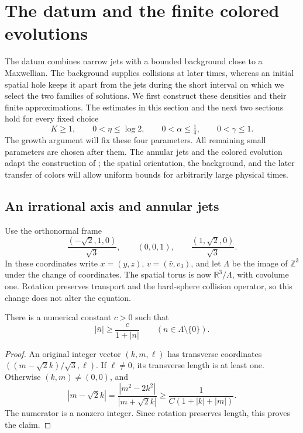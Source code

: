 \section{The datum and the finite colored evolutions}
\label{sec:construction}

The datum combines narrow jets with a bounded background close to a
Maxwellian.  The background supplies collisions at later times, whereas
an initial spatial hole keeps it apart from the jets during the short
interval on which we select the two families of solutions.  We first
construct these densities and their finite approximations.  The estimates
in this section and the next two sections hold for every fixed choice
\begin{equation}
 K\ge1,\qquad 0<\eta\le\log2,\qquad
 0<\alpha\le\tfrac14,\qquad 0<\gamma\le1.
 \label{con:parameters}
\end{equation}
The growth argument will fix these four parameters.  All remaining
small parameters are chosen after them.  The annular jets and the
colored evolution adapt the construction of
\cite[Sections 4--5]{OpenAIPeriodic}; the spatial orientation, the
background, and the later transfer of colors will allow uniform bounds
for arbitrarily large physical times.

\subsection{An irrational axis and annular jets}

Use the orthonormal frame
\[
 \frac{(-\sqrt2,1,0)}{\sqrt3},\qquad (0,0,1),\qquad
 \frac{(1,\sqrt2,0)}{\sqrt3}.
\]
In these coordinates write \(x=(y,z)\), \(v=(\bar v,v_3)\), and let
\(\Lambda\) be the image of \(\mathbb Z^3\) under the change of
coordinates.  The spatial torus is now \(\mathbb R^3/\Lambda\), with
covolume one.  Rotation preserves transport and the hard-sphere
collision operator, so this change does not alter the equation.

\begin{lemma}\label{con:lattice}
There is a numerical constant \(c>0\) such that
\begin{equation}
 |\bar n|\ge\frac{c}{1+|n|}\qquad
             (n\in\Lambda\setminus\{0\}).
 \label{con:diophantine}
\end{equation}
\end{lemma}
\begin{proof}
An original integer vector \((k,m,\ell)\) has transverse coordinates
\(((m-\sqrt2 k)/\sqrt3,\ell)\).  If \(\ell\ne0\), its transverse
length is at least one.  Otherwise \((k,m)\ne(0,0)\), and
\[
 |m-\sqrt2 k|
 =\frac{|m^2-2k^2|}{|m+\sqrt2 k|}
 \ge\frac{1}{C(1+|k|+|m|)}.
\]
The numerator is a nonzero integer.  Since rotation preserves length,
this proves the claim.
\end{proof}

